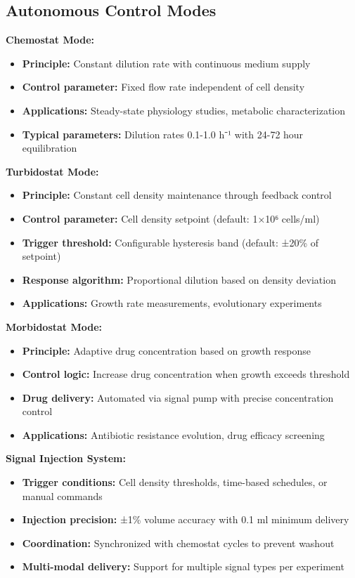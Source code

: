 \subsection{Autonomous Control Modes}

\textbf{Chemostat Mode:}
\begin{itemize}
\item \textbf{Principle:} Constant dilution rate with continuous medium supply
\item \textbf{Control parameter:} Fixed flow rate independent of cell density
\item \textbf{Applications:} Steady-state physiology studies, metabolic characterization
\item \textbf{Typical parameters:} Dilution rates 0.1-1.0 h⁻¹ with 24-72 hour equilibration
\end{itemize}

\textbf{Turbidostat Mode:}
\begin{itemize}
\item \textbf{Principle:} Constant cell density maintenance through feedback control
\item \textbf{Control parameter:} Cell density setpoint (default: 1×10⁶ cells/ml)
\item \textbf{Trigger threshold:} Configurable hysteresis band (default: ±20\% of setpoint)
\item \textbf{Response algorithm:} Proportional dilution based on density deviation
\item \textbf{Applications:} Growth rate measurements, evolutionary experiments
\end{itemize}

\textbf{Morbidostat Mode:}
\begin{itemize}
\item \textbf{Principle:} Adaptive drug concentration based on growth response
\item \textbf{Control logic:} Increase drug concentration when growth exceeds threshold
\item \textbf{Drug delivery:} Automated via signal pump with precise concentration control
\item \textbf{Applications:} Antibiotic resistance evolution, drug efficacy screening
\end{itemize}

\textbf{Signal Injection System:}
\begin{itemize}
\item \textbf{Trigger conditions:} Cell density thresholds, time-based schedules, or manual commands
\item \textbf{Injection precision:} ±1\% volume accuracy with 0.1 ml minimum delivery
\item \textbf{Coordination:} Synchronized with chemostat cycles to prevent washout
\item \textbf{Multi-modal delivery:} Support for multiple signal types per experiment
\end{itemize}


